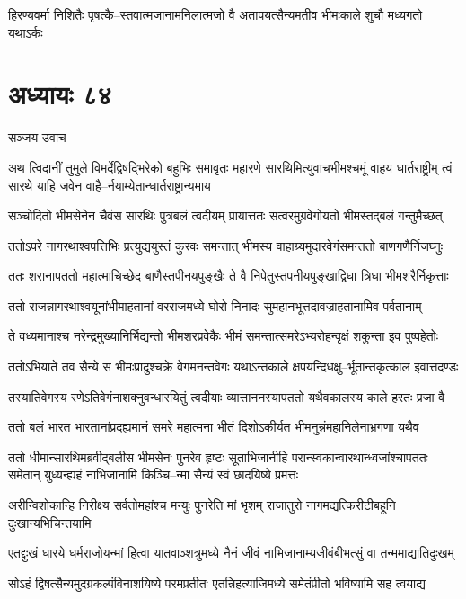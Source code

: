\twolineshloka
{हिरण्यवर्मा निशितैः पृषत्कै--स्तवात्मजानामनिलात्मजो वै}
{अतापयत्सैन्यमतीव भीमःकाले शुचौ मध्यगतो यथाऽर्कः}


\chapter{अध्यायः ८४}
\twolineshloka
{सञ्जय उवाच}
{}


\threelineshloka
{अथ त्विदानीं तुमुले विमर्देद्विषद्भिरेको बहुभिः समावृतः}
{महारणे सारथिमित्युवाचभीमश्चमूं वाहय धार्तराष्ट्रीम्}
{त्वं सारथे याहि जवेन वाहै--र्नयाम्येतान्धार्तराष्ट्रान्यमाय}


\twolineshloka
{सञ्चोदितो भीमसेनेन चैवंस सारथिः पुत्रबलं त्वदीयम्}
{प्रायात्ततः सत्वरमुग्रवेगोयतो भीमस्तद्बलं गन्तुमैच्छत्}


\twolineshloka
{ततोऽपरे नागरथाश्वपत्तिभिः प्रत्युद्ययुस्तं कुरवः समन्तात्}
{भीमस्य वाहाग्र्यमुदारवेगंसमन्ततो बाणगणैर्निजघ्नुः}


\twolineshloka
{ततः शरानापततो महात्माचिच्छेद बाणैस्तपीनयपुङ्खैः}
{ते वै निपेतुस्तपनीयपुङ्खाद्विधा त्रिधा भीमशरैर्निकृत्ताः}


\twolineshloka
{ततो राजन्नागरथाश्वयूनांभीमाहतानां वरराजमध्ये}
{घोरो निनादः सुमहानभूत्तदावज्राहतानामिव पर्वतानाम्}


\twolineshloka
{ते वध्यमानाश्च नरेन्द्रमुख्यानिर्भिद्यन्तो भीमशरप्रवेकैः}
{भीमं समन्तात्समरेऽभ्यरोहन्वृक्षं शकुन्ता इव पुष्पहेतोः}


\twolineshloka
{ततोऽभियाते तव सैन्ये स भीमःप्रादुश्चक्रे वेगमनन्तवेगः}
{यथाऽन्तकाले क्षपयन्दिधक्षु--र्भूतान्तकृत्काल इवात्तदण्डः}


\twolineshloka
{तस्यातिवेगस्य रणेऽतिवेगंनाशक्नुवन्धारयितुं त्वदीयाः}
{व्यात्ताननस्यापततो यथैवकालस्य काले हरतः प्रजा वै}


\twolineshloka
{ततो बलं भारत भारतानांप्रदह्यमानं समरे महात्मना}
{भीतं दिशोऽकीर्यत भीमनुन्नंमहानिलेनाभ्रगणा यथैव}


ततो धीमान्सारथिमब्रवीद्बलीस भीमसेनः पुनरेव हृष्टः
\twolineshloka
{सूताभिजानीहि परान्स्वकान्वारथान्ध्वजांश्चापततः समेतान्}
{युध्यन्ह्यहं नाभिजानामि किञ्चि--न्मा सैन्यं स्वं छादयिष्ये प्रमत्तः}


\twolineshloka
{अरीन्विशोकान्हि निरीक्ष्य सर्वतोमहांश्च मन्युः पुनरेति मां भृशम्}
{राजातुरो नागमद्यत्किरीटीबहूनि दुःखान्यभिचिन्तयामि}


\twolineshloka
{एतद्दुःखं धारये धर्मराजोयन्मां हित्वा यातवाञ्शत्रुमध्ये}
{नैनं जीवं नाभिजानाम्यजीवंबीभत्सुं वा तन्ममाद्यातिदुःखम्}


\twolineshloka
{सोऽहं द्विषत्सैन्यमुदग्रकल्पंविनाशयिष्ये परमप्रतीतः}
{एतन्निहत्याजिमध्ये समेतंप्रीतो भविष्यामि सह त्वयाद्य}


